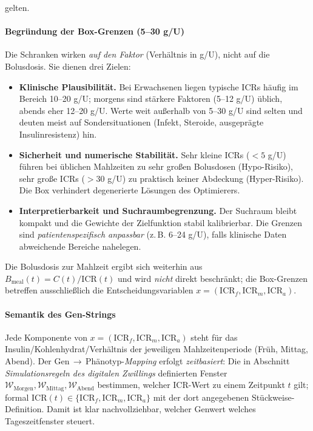 \documentclass[ngerman,a4paper,12pt,pdftex]{article}
\newcommand{\ICR}{\mathrm{ICR}}
\newcommand{\ICRf}{\mathrm{ICR}_f}
\newcommand{\ICRm}{\mathrm{ICR}_m}
\newcommand{\ICRa}{\mathrm{ICR}_a}
\newcommand{\IKRtxt}{Insulin\-/Kohlenhydrat\-/Ver\-h\"altnis}
\begin{document}
gelten.

\paragraph{Begründung der Box-Grenzen (5--30 g/U)}
Die Schranken wirken \emph{auf den Faktor} (Verhältnis in g/U), nicht auf die Bolusdosis. Sie dienen drei Zielen:
\begin{itemize}
  \item \textbf{Klinische Plausibilität.} Bei Erwachsenen liegen typische ICRs häufig im Bereich 10--20 g/U; morgens sind stärkere Faktoren (5--12 g/U) üblich, abends eher 12--20 g/U. Werte weit außerhalb von 5--30 g/U sind selten und deuten meist auf Sondersituationen (Infekt, Steroide, ausgeprägte Insulinresistenz) hin.
  \item \textbf{Sicherheit und numerische Stabilität.} Sehr kleine ICRs (\(<5\) g/U) führen bei üblichen Mahlzeiten zu sehr großen Bolusdosen (Hypo-Risiko), sehr große ICRs (\(>30\) g/U) zu praktisch keiner Abdeckung (Hyper-Risiko). Die Box verhindert degenerierte Lösungen des Optimierers.
  \item \textbf{Interpretierbarkeit und Suchraumbegrenzung.} Der Suchraum bleibt kompakt und die Gewichte der Zielfunktion stabil kalibrierbar. Die Grenzen sind \emph{patientenspezifisch anpassbar} (z.\,B. 6--24 g/U), falls klinische Daten abweichende Bereiche nahelegen.
\end{itemize}
Die Bolusdosis zur Mahlzeit ergibt sich weiterhin aus \(B_{\mathrm{meal}}(t)=C(t)/\ICR(t)\) und wird \emph{nicht} direkt beschränkt; die Box-Grenzen betreffen ausschließlich die Entscheidungsvariablen \(x=(\ICRf,\ICRm,\ICRa)\).


\paragraph{Semantik des Gen-Strings}
Jede Komponente von \(x=(\ICRf,\ICRm,\ICRa)\) steht für das \IKRtxt{} der jeweiligen Mahlzeitenperiode (Früh, Mittag, Abend). Der Gen\,\(\to\)\,Phänotyp-\emph{Mapping} erfolgt \emph{zeitbasiert}: Die in Abschnitt \emph{Simulationsregeln des digitalen Zwillings} definierten Fenster \(\mathcal W_{\mathrm{Morgen}},\mathcal W_{\mathrm{Mittag}},\mathcal W_{\mathrm{Abend}}\) bestimmen, welcher ICR-Wert zu einem Zeitpunkt \(t\) gilt; formal \(\ICR(t)\in\{\ICRf,\ICRm,\ICRa\}\) mit der dort angegebenen Stückweise-Definition. Damit ist klar nachvollziehbar, welcher Genwert welches Tageszeitfenster steuert.
\end{document}
